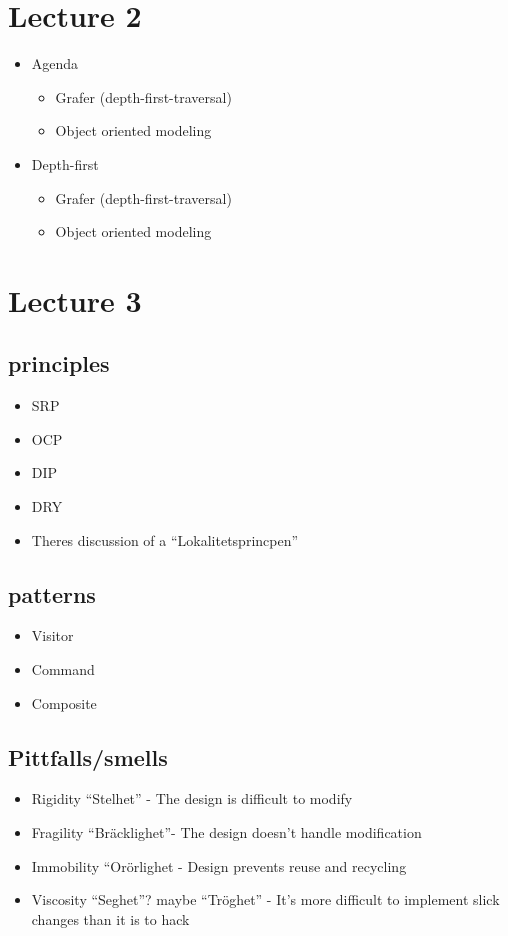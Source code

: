 \documentclass[11pt]{amsart}
\begin{document}
\section{Lecture 2}
\begin{itemize}
\item Agenda
	\begin{itemize}
	\item Grafer (depth-first-traversal)
	\item Object oriented modeling
	\end{itemize}
\item Depth-first
	\begin{itemize}
	\item Grafer (depth-first-traversal)
	\item Object oriented modeling
	\end{itemize}
\end{itemize}

\section{Lecture 3}


\subsection{principles}
\begin{itemize}
\item SRP
\item OCP
\item DIP
\item DRY
\item Theres discussion of a ``Lokalitetsprincpen''
\end{itemize}

\subsection{patterns}

\begin{itemize}
  \item Visitor
  \item Command
  \item Composite
\end{itemize}

\subsection{Pittfalls/smells}
\begin{itemize}
  \item Rigidity ``Stelhet'' - The design is difficult to modify
  \item Fragility ``Bräcklighet''- The design doesn't handle modification
  \item Immobility ``Orörlighet - Design prevents reuse and recycling
  \item Viscosity ``Seghet''? maybe ``Tröghet'' - It's more difficult to
  implement slick changes than it is to hack
\end{itemize}
\end{document}
